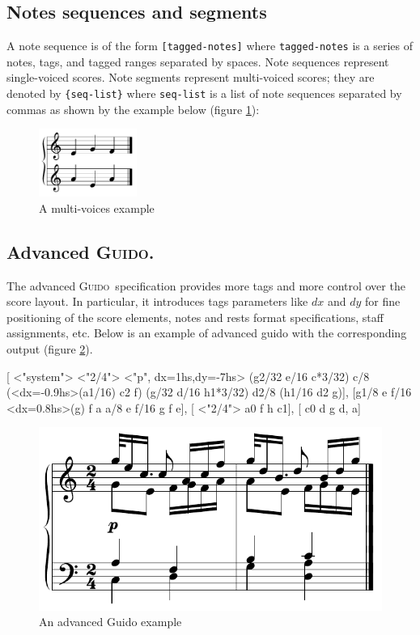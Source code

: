 \documentclass[twoside,10pt,a4paper]{article}
\newenvironment{gmncode}		{\vspace{-2mm}\small\verbatim}{\endverbatim\vspace{-2mm}}
\newcommand{\Guido}	{\textsc{Guido}}
\newcommand{\code}[1]	{{\small \texttt{#1}}}
\newcommand{\codeindent}	{\\ \hspace*{9mm}}
\begin{document}
\subsection{Notes sequences and segments}
A note sequence is of the form \verb+[tagged-notes]+ where \code{tagged-notes} is a series of notes, tags, and tagged ranges separated by spaces. Note sequences represent single-voiced scores.
Note segments represent multi-voiced scores; they are denoted by \verb+{seq-list}+ where \code{seq-list} is a list of note sequences separated by commas as shown by the example below (figure \ref{fig:voices}):
\codeindent\code{ \{ [ e g f ], [ a e a ] \} }
\begin{figure}[h]
	\centering \includegraphics[width=32mm]{rsrc/voices}
 \caption{A multi-voices example}
 \label{fig:voices}
\end{figure}


\subsection{Advanced \Guido.}
The advanced \Guido\ specification provides more tags and more control over the score layout.
In particular, it introduces tags parameters like $dx$ and $dy$ for fine positioning of the score elements, notes and rests format specifications, staff assignments, etc. 
Below is an example of advanced guido with the corresponding output (figure \ref{advex}).

\begin{gmncode} 
{
 [
  \barFormat<"system">
   \stemsUp \meter<"2/4"> 
  \intens<"p", dx=1hs,dy=-7hs>
  \beam(g2/32 e/16 c*3/32) c/8 
  \beam(\noteFormat<dx=-0.9hs>(a1/16) c2 f) 
  \beam(g/32 d/16 h1*3/32) d2/8 
  \beam(h1/16 d2 g)],
 [\stemsDown g1/8 e
  f/16 \noteFormat<dx=0.8hs>(g) f a a/8 e 
  f/16 g f e],
 [ \meter<"2/4"> 
  \stemsUp a0 f h c1],
 [ \stemsDown c0 d g {d, a}]
}
\end{gmncode} 

\begin{figure}[h]
	\centering \includegraphics[width=0.85\columnwidth]{rsrc/4voices}
 \caption{An advanced Guido example}
 \label{advex}
\end{figure}
\end{document}
